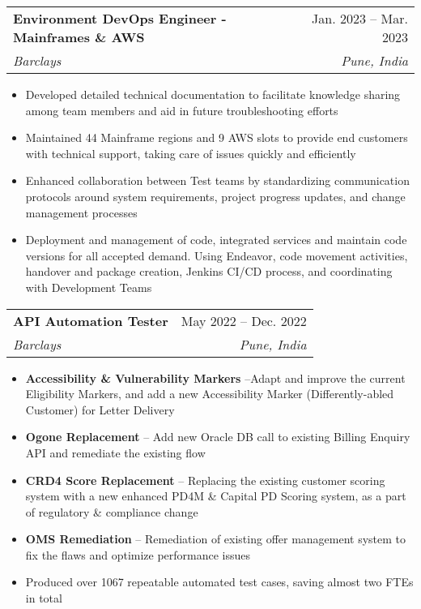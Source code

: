 \documentclass[letterpaper,11pt]{article}
\makeatletter
\newcommand{\resumeItem}[1]{
  \item\small{
    {#1 \vspace{-2pt}}
  }
}
\newcommand{\resumeSubheading}[4]{
  \vspace{-2pt}\item
    \begin{tabular*}{0.97\textwidth}[t]{l@{\extracolsep{\fill}}r}
      \textbf{#1} & #2 \\
      \textit{\small#3} & \textit{\small #4} \\
    \end{tabular*}\vspace{-7pt}
}
\newcommand{\resumeSubSubheading}[2]{
    \item
    \begin{tabular*}{0.97\textwidth}{l@{\extracolsep{\fill}}r}
      \textit{\small#1} & \textit{\small #2} \\
    \end{tabular*}\vspace{-7pt}
}
\newcommand{\resumeSubHeadingListEnd}{\end{itemize}}
\newcommand{\resumeItemListStart}{\begin{itemize}}
\newcommand{\resumeItemListEnd}{\end{itemize}\vspace{-5pt}}
\makeatother
\begin{document}

    \resumeSubheading
      {Environment DevOps Engineer - Mainframes \& AWS}{Jan. 2023 -- Mar. 2023}
      {Barclays}{Pune, India}
      \resumeItemListStart
        \resumeItem{Developed detailed technical documentation to facilitate knowledge sharing among team members and aid in future troubleshooting efforts}
        \resumeItem{Maintained 44 Mainframe regions and 9 AWS slots to provide end customers with technical support, taking care of issues quickly and efficiently}
        \resumeItem{Enhanced collaboration between Test teams by standardizing communication protocols around system requirements, project progress updates, and change management processes}
        \resumeItem{Deployment and management of code, integrated services and maintain code versions for all accepted demand. Using Endeavor, code movement activities, handover and package creation, Jenkins CI/CD process, and coordinating with Development Teams}
    \resumeItemListEnd

    \resumeSubheading
      {API Automation Tester}{May 2022 -- Dec. 2022}
      {Barclays}{Pune, India}
      \resumeItemListStart
        \resumeItem{\textbf{Accessibility \& Vulnerability Markers} –Adapt and improve the current Eligibility Markers, and add a new Accessibility Marker (Differently-abled Customer) for Letter Delivery}
        \resumeItem{\textbf{Ogone Replacement} – Add new Oracle DB call to existing Billing Enquiry API and remediate the existing flow}
        \resumeItem{\textbf{CRD4 Score Replacement} – Replacing the existing customer scoring system with a new enhanced PD4M \& Capital PD Scoring system, as a part of regulatory \& compliance change}
        \resumeItem{\textbf{OMS Remediation} – Remediation of existing offer management system to fix the flaws and optimize performance issues}
        \resumeItem{Produced over 1067 repeatable automated test cases, saving almost two FTEs in total}
      \resumeItemListEnd
\end{document}
